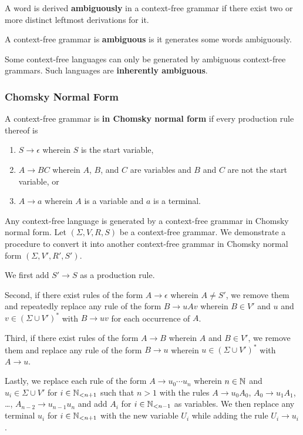 \Bdf
    A word is derived {\bf ambiguously} in a context-free grammar if there exist
    two or more distinct leftmost derivations for it.

    A context-free grammar is {\bf ambiguous} is it generates some words
    ambiguously.
\Edf

Some context-free languages can only be generated by ambiguous context-free
grammars. Such languages are {\bf inherently ambiguous}.

\subsubsection{Chomsky Normal Form}

\Bdf
    A context-free grammar is {\bf in Chomsky normal form} if every production
    rule thereof is
    \begin{enumerate}
        \item \(S \to \epsilon\) wherein \(S\) is the start variable,
        \item \(A \to B C\) wherein \(A\), \(B\), and \(C\) are variables and
        \(B\) and \(C\) are not the start variable, or
        \item \(A \to a\) wherein \(A\) is a variable and \(a\) is a terminal.
    \end{enumerate}
\Edf

\Bth
    Any context-free language is generated by a context-free grammar in Chomsky
    normal form.
\Eth
\Bpr
    Let \((\Sigma, V, R, S)\) be a context-free grammar. We demonstrate a
    procedure to convert it into another context-free grammar in Chomsky normal
    form \((\Sigma, V', R', S')\).

    We first add \(S' \to S\) as a production rule.

    Second, if there exist rules of the form \(A \to \epsilon\) wherein \(A \neq
    S'\), we remove them and repeatedly replace any rule of the form \(B \to u A
    v\) wherein \(B \in V'\) and \(u\) and \(v \in (\Sigma \cup V')^*\) with \(B
    \to u v\) for each occurrence of \(A\).

    Third, if there exist rules of the form \(A \to B\) wherein \(A\) and \(B
    \in V'\), we remove them and replace any rule of the form \(B \to u\)
    wherein \(u \in (\Sigma \cup V')^*\) with \(A \to u\).

    Lastly, we replace each rule of the form \(A \to u_0 \cdots u_n\) wherein
    \(n \in \setnat\) and \(u_i \in \Sigma \cup V'\) for \(i \in \Nln[n + 1]\)
    such that \(n > 1\) with the rules \(A \to u_0 A_0\), \(A_0 \to u_1 A_1\),
    \ldots, \(A_{n - 2} \to u_{n - 1} u_n\) and add \(A_i\) for \(i \in \Nln[n -
    1]\) as variables. We then replace any terminal \(u_i\) for \(i \in \Nln[n +
    1]\) with the new variable \(U_i\) while adding the rule \(U_i \to u_i\).

